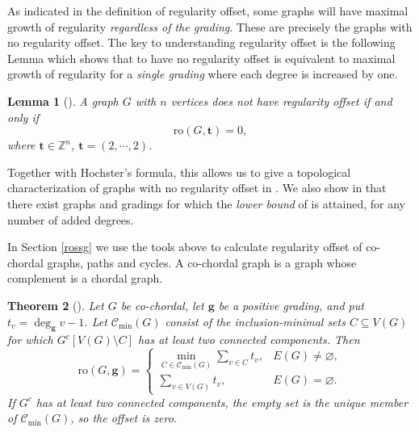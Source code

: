 \documentclass[dvipsnames,10pt]{article}
\newtheorem{theorem}{Theorem}[section]
\newtheorem{lemma}[theorem]{Lemma}
\begin{document}
As indicated in the definition of regularity offset, some graphs will have maximal growth of regularity \emph{regardless of the grading}. These are precisely the graphs with no regularity offset. The key to understanding regularity offset is the following Lemma which shows that to have no regularity offset is equivalent to maximal growth of regularity for a \emph{single grading} where each degree is increased by one.

\begin{lemma}[]
    A graph $G$ with $n$ vertices does not have regularity offset if and only if
    \begin{equation*}
        \mathrm{ro}(G,\mathbf{t})=0,
    \end{equation*}
     where $\mathbf{t}\in\mathbb{Z}^n$, $\mathbf{t}=(2,\cdots,2)$.
\end{lemma}
Together with Hochster's formula, this allows us to give a topological characterization of graphs with no regularity offset in . We also show in  that there exist graphs and gradings for which the \emph{lower bound} of  is attained, for any number of added degrees.





In Section \ref{rossg} we use the tools above to calculate regularity offset of co-chordal graphs, paths and cycles.
A co-chordal graph is a graph whose complement is a chordal graph. %

\begin{theorem}[]
    Let $G$ be co-chordal, let $\mathbf{g}$ be a positive grading, and put $t_v=\deg_{\mathbf{g}}v-1$. Let $\mathcal{C}_{\min}(G)$ consist of the inclusion-minimal sets $C\subseteq V(G)$ for which $G^c[V(G)\setminus C]$ has at least two connected components. Then
    \[
        \mathrm{ro}(G,\mathbf{g})=
        \begin{cases}
            \displaystyle\min_{C\in\mathcal{C}_{\min}(G)}\sum_{v\in C}t_v,
                & E(G)\neq\varnothing,\\[4pt]
            \displaystyle\sum_{v\in V(G)}t_v,
                & E(G)=\varnothing.
        \end{cases}
    \]
    If $G^c$ has at least two connected components, the empty set is the unique member of $\mathcal{C}_{\min}(G)$, so the offset is zero.
\end{theorem}
\end{document}
